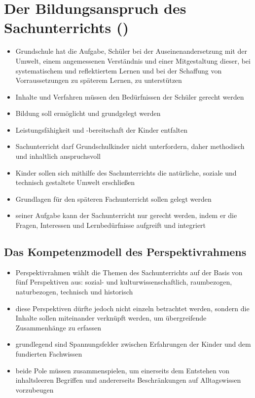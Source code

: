 \newpage
\section{Der Bildungsanspruch des Sachunterrichts (\cite{GPS13})}
\begin{itemize}
	\item{Grundschule hat die Aufgabe, Schüler bei der 		Auseinenandersetzung mit der Umwelt, einem angemessenen 	Verständnis und einer Mitgestaltung dieser, bei 		systematischem und reflektiertem Lernen und bei 	der Schaffung von Vorraussetzungen zu späterem Lernen, zu 		unterstützen}
	\item{Inhalte und Verfahren müssen den Bedürfnissen der Schüler gerecht werden}
	\item{Bildung soll ermöglicht und grundgelegt werden}
	\item{Leistungsfähigkeit und -bereitschaft der Kinder entfalten}
	\item{Sachunterricht darf Grundschulkinder nicht unterfordern, daher methodisch und inhaltlich anspruchsvoll}
	\item{Kinder sollen sich mithilfe des Sachunterrichts die natürliche, soziale und technisch gestaltete Umwelt erschließen}
	\item{Grundlagen für den späteren Fachunterricht sollen gelegt werden}
	\item{seiner Aufgabe kann der Sachunterricht nur gerecht werden, indem er die Fragen, Interessen und Lernbedürfnisse aufgreift und integriert}
\end{itemize}

\subsection{Das Kompetenzmodell des Perspektivrahmens}
\begin{itemize}
	\item{Perspektivrahmen wählt die Themen des Sachunterrichts auf der Basis von fünf Perspektiven aus: sozial- und kulturwissenschaftlich, raumbezogen, naturbezogen, technisch und historisch}
	\item{diese Perspektiven dürfte jedoch nicht einzeln betrachtet werden, sondern die Inhalte sollen miteinander verknüpft werden, um übergreifende Zusammenhänge zu erfassen}
	\item{grundlegend sind Spannungsfelder zwischen Erfahrungen der Kinder und dem fundierten Fachwissen}
	\item{beide Pole müssen zusammenspielen, um einerseits dem Entstehen von inhaltsleeren Begriffen und andererseits Beschränkungen auf Alltagswissen vorzubeugen}
\end{itemize}

